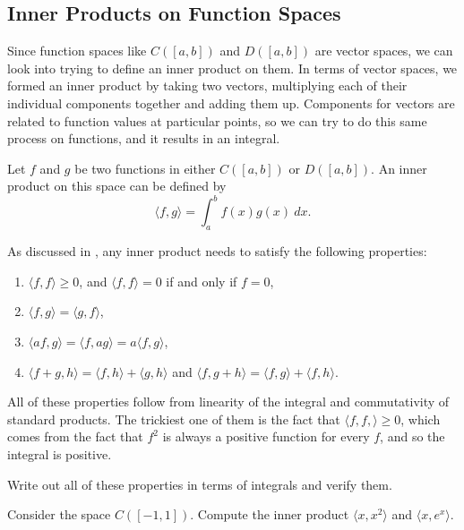 \documentclass{ximera}
\begin{document}
\subsection{Inner Products on Function Spaces}

Since function spaces like $C([a,b])$ and $D([a,b])$ are vector spaces, we can look into trying to define an inner product on them. In terms of vector spaces, we formed an inner product by taking two vectors, multiplying each of their individual components together and adding them up. Components for vectors are related to function values at particular points, so we can try to do this same process on functions, and it results in an integral.

\begin{definition}
    Let $f$ and $g$ be two functions in either $C([a,b])$ or $D([a,b])$. An inner product on this space can be defined by
    \[ 
        \langle f, g \rangle = \int_a^b f(x)g(x)\ dx. 
    \]
\end{definition}

As discussed in , any inner product needs to satisfy the following properties:
\begin{enumerate}
    \item $\langle f , f \rangle \geq 0$, and $\langle f , f \rangle = 0$ if and only if $f = 0$,
    \item $\langle f , g \rangle = \langle g ,f \rangle$,
    \item $\langle af , g\rangle = \langle f , ag \rangle = a \langle f , g \rangle$,
    \item 
        $\langle f +  g , h \rangle = \langle f , h \rangle + \langle g, h \rangle$ 
        and
        $\langle f, g + h \rangle = \langle f , g \rangle + \langle f , h \rangle$.
\end{enumerate}

All of these properties follow from linearity of the integral and commutativity of standard products. The trickiest one of them is the fact that $\langle f, f, \rangle \geq 0$, which comes from the fact that $f^2$ is always a positive function for every $f$, and so the integral is positive.

\begin{exercise}
    Write out all of these properties in terms of integrals and verify them.
\end{exercise}

\begin{example}
    Consider the space $C([-1,1])$. Compute the inner product $\langle x, x^2 \rangle$ and $\langle x, e^x \rangle$. 
\end{example}
\end{document}
